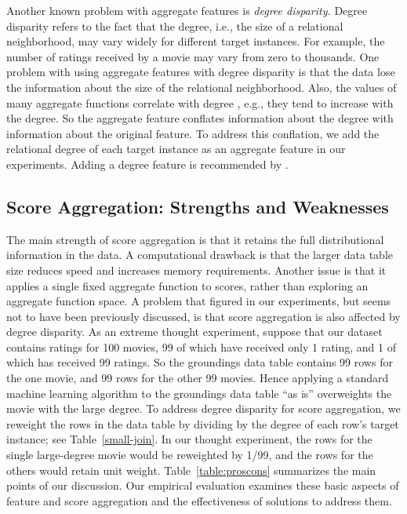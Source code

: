 \documentclass[conference]{IEEEtran}
\begin{document}
Another known problem with aggregate features is {\em degree disparity.} Degree disparity refers to the fact that the degree, i.e., the size of a relational neighborhood, may vary widely for different target instances. For example, the number of ratings received by a movie may vary from zero to thousands. One problem with using aggregate features with degree disparity is that the data lose the information about the size of the relational neighborhood. Also, the values of many aggregate functions correlate with degree \cite{Jensen2003}, e.g., they tend to increase with the degree. So the aggregate feature conflates information about the degree with information about the original feature. To address this conflation, we add the relational degree of each target instance as an aggregate feature in our experiments. Adding a degree feature is recommended by \cite{Jensen2003}.

\subsection{Score Aggregation: Strengths and Weaknesses} The main strength of score aggregation is that it retains the full distributional information in the data. A computational drawback is that the larger data table size reduces speed and increases memory requirements. Another issue is that it applies a single fixed aggregate function to scores, rather than exploring an aggregate function space. A problem that figured  in our experiments, but seems not to have been previously discussed, is that score aggregation is also affected by degree disparity. As an extreme thought experiment, suppose that our dataset contains ratings for 100 movies, 99 of which have received only 1 rating, and 1 of which has received 99 ratings. So the groundings data table contains 99 rows for the one movie, and 99 rows for the other 99 movies. Hence applying a standard machine learning algorithm to the groundings data table ``as is'' overweights the movie with the large degree. To address degree disparity for score aggregation, we reweight the rows in the data table by dividing by the degree of each row's target instance; see Table~\ref{small-join}. In our thought experiment, the rows for the single large-degree movie would be reweighted by 1/99, and the rows for the others would retain unit weight. Table~\ref{table:proscons} summarizes the main points of our discussion.
Our empirical evaluation examines these basic aspects of feature and score aggregation and the effectiveness of solutions to address them.
\end{document}
